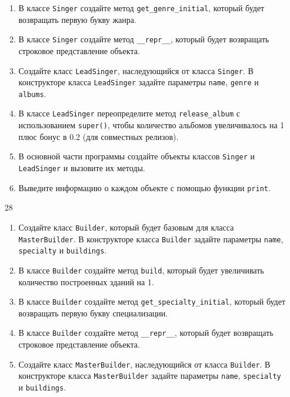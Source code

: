 \begin{enumerate}
\begin{enumerate}[leftmargin=*]
    \item В классе \texttt{Singer} создайте метод \texttt{get\_genre\_initial}, который будет возвращать первую букву жанра.
    
    \item В классе \texttt{Singer} создайте метод \texttt{\_\_repr\_\_}, который будет возвращать строковое представление объекта.
    
    \item Создайте класс \texttt{LeadSinger}, наследующийся от класса \texttt{Singer}. В конструкторе класса \texttt{LeadSinger} задайте параметры \texttt{name}, \texttt{genre} и \texttt{albums}.
    
    \item В классе \texttt{LeadSinger} переопределите метод \texttt{release\_album} с использованием \texttt{super()}, чтобы количество альбомов увеличивалось на 1 плюс бонус в 0.2 (для совместных релизов).
    
    \item В основной части программы создайте объекты классов \texttt{Singer} и \texttt{LeadSinger} и вызовите их методы.
    
    \item Выведите информацию о каждом объекте с помощью функции \texttt{print}.
\end{enumerate}

\item[28] 
\begin{enumerate}[leftmargin=*]
    \item Создайте класс \texttt{Builder}, который будет базовым для класса \texttt{MasterBuilder}. В конструкторе класса \texttt{Builder} задайте параметры \texttt{name}, \texttt{specialty} и \texttt{buildings}.
    
    \item В классе \texttt{Builder} создайте метод \texttt{build}, который будет увеличивать количество построенных зданий на 1.
    
    \item В классе \texttt{Builder} создайте метод \texttt{get\_specialty\_initial}, который будет возвращать первую букву специализации.
    
    \item В классе \texttt{Builder} создайте метод \texttt{\_\_repr\_\_}, который будет возвращать строковое представление объекта.
    
    \item Создайте класс \texttt{MasterBuilder}, наследующийся от класса \texttt{Builder}. В конструкторе класса \texttt{MasterBuilder} задайте параметры \texttt{name}, \texttt{specialty} и \texttt{buildings}.
    

\end{enumerate}
\end{enumerate}
